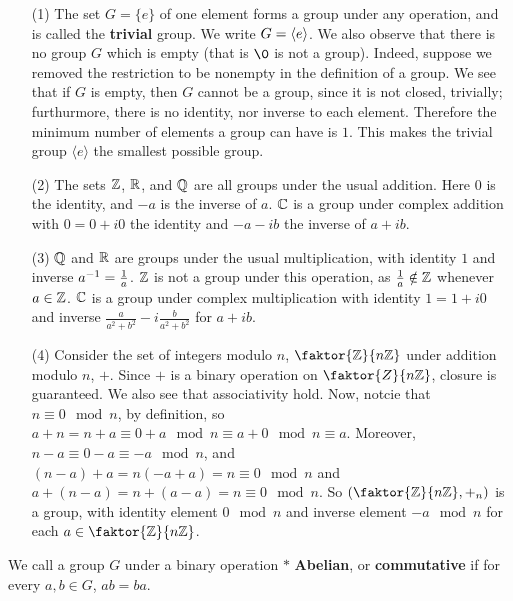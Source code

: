 \begin{example}\label{example_1.2}
  \begin{enumerate}
    \item[(1)] The set $G=\{e\}$ of one element forms a group under any
      operation, and is called the \textbf{trivial} group. We write
      $G=\langle e\rangle$. We also observe that there is no group $G$ which
      is empty (that is $\0$ is not a group). Indeed, suppose we removed
      the restriction to be nonempty in the definition of a group. We see
      that if $G$ is empty, then  $G$ cannot be a group, since it is
      not closed, trivially; furthurmore, there is no identity, nor inverse
      to each element. Therefore the minimum number of elements a group can
      have is $1$. This makes the trivial group $\langle e \rangle$
      the smallest possible group.

    \item[(2)] The sets $\mathbb{Z}$,  $\mathbb{R}$, and  $\mathbb{Q}$ are all groups under the
      usual addition. Here $0$ is the identity, and  $-a$ is the inverse
      of  $a$.  $\mathbb{C}$ is a group under complex addition with $0=0+i0$ the
      identity and $-a-ib$ the inverse of $a+ib$.

    \item[(3)] $\mathbb{Q}$ and  $\mathbb{R}$ are groups under the usual multiplication,
      with identity  $1$ and inverse  $a^{-1}=\frac{1}{a}$. $\mathbb{Z}$ is not a
      group under this operation, as  $\frac{1}{a} \notin \mathbb{Z}$ whenever $a
      \in \mathbb{Z}$.  $\mathbb{C}$ is a group under complex multiplication with identity
      $1=1+i0$ and inverse $\frac{a}{a^2+b^2}-i\frac{b}{a^2+b^2}$ for
      $a+ib$.

    \item[(4)] Consider the set of integers modulo $n$, $\faktor{\Z}{n\Z}$
      under addition modulo $n$, $+$. Since  $+$ is a binary operation on
      $\faktor{Z}{n\Z}$, closure is guaranteed. We also see that
      associativity hold. Now, notcie that $n \equiv 0 \mod{n}$, by
      definition, so $a+n=n+a \equiv 0+a \mod{n} \equiv a+0 \mod{n}
      \equiv a$. Moreover, $n-a \equiv 0-a \equiv -a \mod{n}$, and
      $(n-a)+a=n(-a+a)=n \equiv 0 \mod{n}$ and $a+(n-a)=n+(a-a)=n \equiv
      0 \mod{n}$. So $(\faktor{\Z}{n\Z}, +_n)$ is a group, with identity
      element $0 \mod{n}$ and inverse element $-a \mod{n}$ for each $a
      \in \faktor{\Z}{n\Z}$.
  \end{enumerate}
\end{example}

\begin{definition}
  We call a group $G$ under a binary operation  $\ast$  \textbf{Abelian}, or
  \textbf{commutative} if for every $a,b \in G$,  $ab=ba$.
\end{definition}

